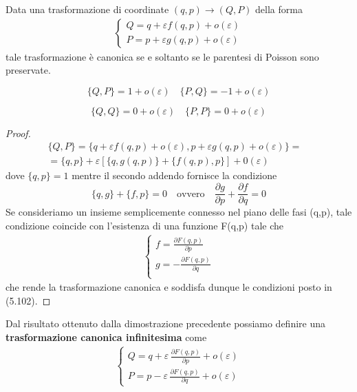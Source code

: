 \begin{theorem}
	Data una trasformazione di coordinate $(q,p) \rightarrow (Q,P)$ della forma 
	\begin{align}
	\begin{cases}
		Q = q + \varepsilon f(q,p) + o(\varepsilon)\\
		P = p + \varepsilon g(q,p) + o(\varepsilon)
	\end{cases}
\end{align}
tale trasformazione \`{e} canonica se e soltanto se le parentesi di Poisson sono preservate.
\end{theorem}
\begin{equation}
	\Big \{  Q,P \Big \} =  1 + o(\varepsilon) \quad \Big \{  P,Q \Big \} = -1 + o(\varepsilon)
\end{equation}

\begin{equation*}
	\Big \{  Q,Q \Big \} = 0 + o(\varepsilon) \quad \Big \{  P,P \Big \} = 0 +  o(\varepsilon)
\end{equation*}

\begin{proof}
\begin{align*}
	\Big \{  Q,P \Big \} = \{q+\varepsilon f(q, p)+o(\varepsilon), p+\varepsilon g(q, p)+o(\varepsilon)\}= &\\
	= \{q, p\}+\varepsilon[\{q, g(q, p)\}+\{f(q, p), p\}]+0(\varepsilon) 
\end{align*}
dove $\{q, p\} = 1$ mentre il secondo addendo fornisce la condizione
\begin{equation}
	\{q, g\}+\{f, p\}=0 \quad \text{ovvero} \quad \frac{\partial g}{\partial p}+\frac{\partial f}{\partial q}=0
\end{equation}
Se consideriamo un insieme semplicemente connesso nel piano delle fasi (q,p), tale condizione coincide con l'esistenza di una funzione F(q,p) tale che 
\begin{align}
	\begin{cases}
		f= \frac{\partial F(q,p)}{\partial p} \\
		g= - \frac{\partial  F(q,p)}{\partial q}\\
	\end{cases}
\end{align}
che rende la trasformazione canonica e soddisfa dunque le condizioni posto in (5.102).

\end{proof}
\noindent Dal risultato ottenuto dalla dimostrazione precedente possiamo definire una \textbf{trasformazione canonica infinitesima} come
\begin{align}
	\begin{cases}
		Q = q + \varepsilon \,\frac{\partial F(q,p)}{\partial p} + o(\varepsilon)\\
		P = p - \varepsilon  \,\frac{\partial  F(q,p)}{\partial q}+ o(\varepsilon)
	\end{cases}
\end{align}

